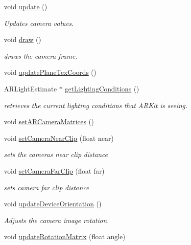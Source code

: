 \begin{DoxyCompactItemize}
void \hyperlink{class_a_r_core_1_1_a_r_cam_a900296e2ff23dfa7deb8bfab58fd0729}{update} ()
\begin{DoxyCompactList}\small\item\em Updates camera values. \end{DoxyCompactList}\item 
void \hyperlink{class_a_r_core_1_1_a_r_cam_ac6506992ee88e0acd20d851849ebfa18}{draw} ()
\begin{DoxyCompactList}\small\item\em draws the camera frame. \end{DoxyCompactList}\item 
void \hyperlink{class_a_r_core_1_1_a_r_cam_a577095ff1d35c84708f578d07df5ac33}{update\+Plane\+Tex\+Coords} ()
\item 
A\+R\+Light\+Estimate $\ast$ \hyperlink{class_a_r_core_1_1_a_r_cam_ad11f88524d97445892956def3864523e}{get\+Lighting\+Conditions} ()
\begin{DoxyCompactList}\small\item\em retrieves the current lighting conditions that A\+R\+Kit is seeing. \end{DoxyCompactList}\item 
void \hyperlink{class_a_r_core_1_1_a_r_cam_ac554b8254ea4a22f122f25542694dafa}{set\+A\+R\+Camera\+Matrices} ()
\item 
void \hyperlink{class_a_r_core_1_1_a_r_cam_a040d67ba6abb95e914760ca6e64ac664}{set\+Camera\+Near\+Clip} (float near)
\begin{DoxyCompactList}\small\item\em sets the camera\textquotesingle{}s near clip distance \end{DoxyCompactList}\item 
void \hyperlink{class_a_r_core_1_1_a_r_cam_aa29191b58c0e6613850916526c6ab380}{set\+Camera\+Far\+Clip} (float far)
\begin{DoxyCompactList}\small\item\em sets camera far clip distance \end{DoxyCompactList}\item 
void \hyperlink{class_a_r_core_1_1_a_r_cam_a0c910d5c7f637ce2820132255dfb67f7}{update\+Device\+Orientation} ()
\begin{DoxyCompactList}\small\item\em Adjusts the camera image rotation. \end{DoxyCompactList}\item 
void \hyperlink{class_a_r_core_1_1_a_r_cam_a1813b2b0f2665741173228ffff518d67}{update\+Rotation\+Matrix} (float angle)

\end{DoxyCompactItemize}
